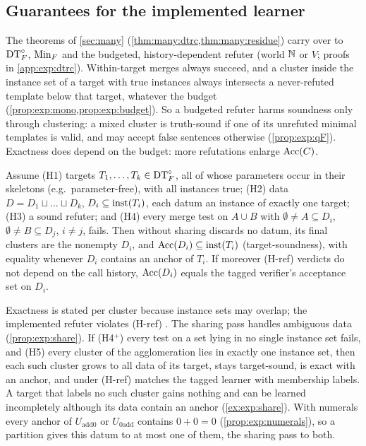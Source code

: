 \subsection{Guarantees for the implemented learner}\label{sec:exp:theory}

The theorems of \cref{sec:many} (\cref{thm:many:dtrc,thm:many:residue}) carry over to $\mathrm{DT}^{\circ}_{F}$, $\mathrm{Min}_F$ and the budgeted, history-dependent refuter (world $\mathbb{N}$ or $V$; proofs in \cref{app:exp:dtrc}). Within-target merges always succeed, and a cluster inside the instance set of a target with true instances always intersects a never-refuted template below that target, whatever the budget (\cref{prop:exp:mono,prop:exp:budget}). So a budgeted refuter harms soundness only through clustering: a mixed cluster is truth-sound if one of its unrefuted minimal templates is valid, and may accept false sentences otherwise (\cref{prop:exp:qF}). Exactness does depend on the budget: more refutations enlarge $\mathrm{Acc}(C)$.

\begin{theorem}\label{thm:exp:dtrc}
Assume \textup{(H1)} targets $T_1,\dots,T_k\in\mathrm{DT}^{\circ}_{F}$, all of whose parameters occur in their skeletons \textup{(}e.g.\ parameter-free\textup{)}, with all instances true; \textup{(H2)} data $D=D_1\sqcup\dots\sqcup D_k$, $D_i\subseteq\mathrm{inst}(T_i)$, each datum an instance of exactly one target; \textup{(H3)} a sound refuter; and \textup{(H4)} every merge test on $A\cup B$ with $\emptyset\neq A\subseteq D_i$, $\emptyset\neq B\subseteq D_j$, $i\neq j$, fails. Then \textup{\DTRC{}} without sharing discards no datum, its final clusters are the nonempty $D_i$, and $\mathrm{Acc}(D_i)\subseteq\mathrm{inst}(T_i)$ (target-soundness), with equality whenever $D_i$ contains an anchor of $T_i$. If moreover \textup{(H-ref)} verdicts do not depend on the call history, $\mathrm{Acc}(D_i)$ equals the tagged verifier's acceptance set on $D_i$.
\end{theorem}

Exactness is stated per cluster because instance sets may overlap; the implemented refuter violates (H-ref) . The sharing pass handles ambiguous data (\cref{prop:exp:share}). If \textup{(H4$^+$)} every test on a set lying in no single instance set fails, and \textup{(H5)} every cluster of the agglomeration lies in exactly one instance set, then each such cluster grows to all data of its target, stays target-sound, is exact with an anchor, and under (H-ref) matches the tagged learner with membership labels. A target that labels no such cluster gains nothing and can be learned incompletely although its data contain an anchor (\cref{ex:exp:share}). With numerals every anchor of $U_{\mathrm{add0}}$ or $U_{\mathrm{0add}}$ contains $0+0=0$ (\cref{prop:exp:numerals}), so a partition gives this datum to at most one of them, the sharing pass to both.

